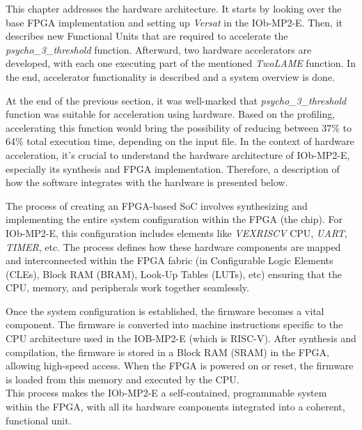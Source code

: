 This chapter addresses the hardware architecture. It starts by looking over the base FPGA implementation and setting up \textit{Versat} in the IOb-MP2-E. Then, it describes new Functional Units that are required to accelerate the \textit{psycho\_3\_threshold} function. Afterward, two hardware accelerators are developed, with each one executing part of the mentioned \textit{TwoLAME} function. In the end, accelerator functionality is described and a system overview is done.

At the end of the previous section, it was well-marked that \textit{psycho\_3\_threshold} function was suitable for acceleration using hardware. Based on the profiling, accelerating this function would bring the possibility of reducing between 37\% to 64\% total execution time, depending on the input file.
In the context of hardware acceleration, it's crucial to understand the hardware architecture of IOb-MP2-E, especially its synthesis and FPGA implementation. Therefore, a description of how the software integrates with the hardware is presented below.

The process of creating an FPGA-based SoC involves synthesizing and implementing the entire system configuration within the FPGA (the chip). For IOb-MP2-E, this configuration includes elements like \textit{VEXRISCV} CPU, \textit{UART}, \textit{TIMER}, etc.
The process defines how these hardware components are mapped and interconnected within the FPGA fabric (in Configurable Logic Elements (CLEs), Block RAM (BRAM), Look-Up Tables (LUTs), etc) ensuring that the CPU, memory, and peripherals work together seamlessly.

Once the system configuration is established, the firmware becomes a vital component. The firmware is converted into machine instructions specific to the CPU architecture used in the IOB-MP2-E (which is RISC-V). After synthesis and compilation, the firmware is stored in a Block RAM (SRAM) in the FPGA, allowing high-speed access. When the FPGA is powered on or reset, the firmware is loaded from this memory and executed by the CPU. \\
This process makes the IOb-MP2-E a self-contained, programmable system within the FPGA, with all its hardware components integrated into a coherent, functional unit.

